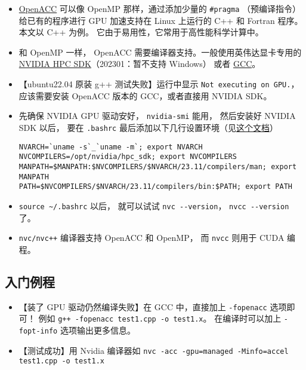
\begin{issues}
\issueDraft
\end{issues}


\begin{itemize}
\item \href{https://www.openacc.org/}{OpenACC} 可以像 OpenMP 那样，通过添加少量的 \verb`#pragma` （预编译指令）给已有的程序进行 GPU 加速支持在 Linux 上运行的 C++ 和 Fortran 程序。本文以 C++ 为例。 它由于易用性，它常用于高性能科学计算中。
\item 和 OpenMP 一样， OpenACC 需要编译器支持。一般使用英伟达显卡专用的 \href{https://developer.nvidia.com/hpc-sdk}{NVIDIA HPC SDK}（202301：暂不支持 Windows） 或者 \href{https://www.openacc.org/tools/gcc-for-openacc}{GCC}。
\item 【ubuntu22.04 原装 g++ 测试失败】运行中显示 \verb`Not executing on GPU.`，应该需要安装 OpenACC 版本的 GCC，或者直接用 NVIDIA SDK。
\item 先确保 NVIDIA GPU 驱动安好， \verb`nvidia-smi` 能用， 然后安装好 NVIDIA SDK 以后， 要在 \verb`.bashrc` 最后添加以下几行设置环境（见\href{https://docs.nvidia.com/hpc-sdk//hpc-sdk-install-guide/index.html}{这个文档}）
\begin{lstlisting}[language=none]
NVARCH=`uname -s`_`uname -m`; export NVARCH
NVCOMPILERS=/opt/nvidia/hpc_sdk; export NVCOMPILERS
MANPATH=$MANPATH:$NVCOMPILERS/$NVARCH/23.11/compilers/man; export MANPATH
PATH=$NVCOMPILERS/$NVARCH/23.11/compilers/bin:$PATH; export PATH
\end{lstlisting}
\item \verb`source ~/.bashrc` 以后， 就可以试试 \verb`nvc --version`， \verb`nvcc --version` 了。
\item \verb`nvc/nvc++` 编译器支持 OpenACC 和 OpenMP， 而 \verb`nvcc` 则用于 CUDA 编程。
\end{itemize}

\subsection{入门例程}
\begin{itemize}
\item 【装了 GPU 驱动仍然编译失败】在 GCC 中，直接加上 \verb`-fopenacc` 选项即可！ 例如 \verb`g++ -fopenacc test1.cpp -o test1.x`。 在编译时可以加上 \verb`-fopt-info` 选项输出更多信息。
\item 【测试成功】用 Nvidia 编译器如 \verb`nvc -acc -gpu=managed -Minfo=accel test1.cpp -o test1.x`
\end{itemize}

